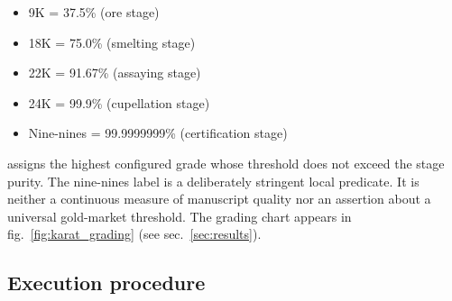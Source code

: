 \documentclass[
  english,
]{article}
\providecommand{\tightlist}{%
  \setlength{\itemsep}{0pt}\setlength{\parskip}{0pt}}
\begin{document}
\begin{itemize}
\tightlist
\item
  9K = 37.5\% (ore stage)
\item
  18K = 75.0\% (smelting stage)
\item
  22K = 91.67\% (assaying stage)
\item
  24K = 99.9\% (cupellation stage)
\item
  Nine-nines = 99.9999999\% (certification stage)
\end{itemize}

 assigns the highest
configured grade whose threshold does not exceed the stage purity. The
nine-nines label is a deliberately stringent local predicate. It is
neither a continuous measure of manuscript quality nor an assertion
about a universal gold-market threshold. The grading chart appears in
fig.~\ref{fig:karat_grading} (see sec.~\ref{sec:results}).

\subsection{Execution procedure}\label{execution-procedure}
\end{document}
